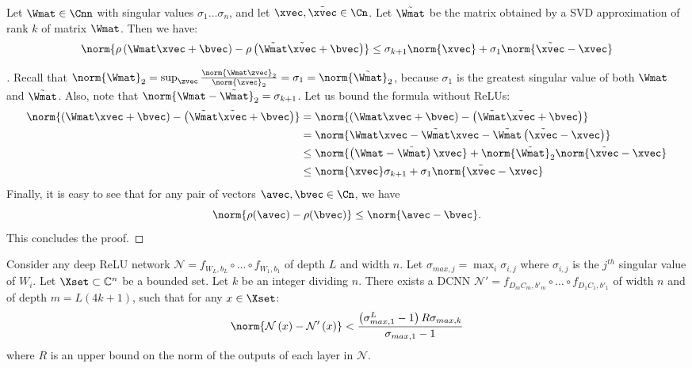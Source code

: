 \begin{lemma}
  Let $\Wmat \in \Cnn$ with singular values $\sigma_{1} \ldots \sigma_{n}$, and let $\xvec,\tilde{\xvec} \in \Cn$.
  Let $\tilde{\Wmat}$ be the matrix obtained by a SVD approximation of rank $k$ of matrix $\Wmat$.
  Then we have:
  \begin{equation}
    \norm{ \rho \left( \Wmat\xvec + \bvec \right) - \rho \left( \tilde{\Wmat}\tilde{\xvec}+\bvec\right)} \le \sigma_{k+1} \norm{\xvec} + \sigma_{1} \norm{\tilde{\xvec} - \xvec} 
  \end{equation}
  \label{lemma:bound_one_layer}
\end{lemma}

\begin{proof}[]
  Recall that $\norm{\Wmat}_{2} = \sup_{\zvec} \frac{\norm{\Wmat\zvec}_2}{\norm{\zvec}_2 } = \sigma_{1} = \norm{\tilde{\Wmat}}_{2}$, because $\sigma_{1}$ is the greatest singular value of both $\Wmat$ and $\tilde{\Wmat}$. Also, note that $\norm{\Wmat - \tilde{\Wmat}}_{2} = \sigma_{k+1}$. Let us bound the formula without ReLUs:
  \begin{align}
    \norm{\left(\Wmat\xvec+\bvec\right) - \left(\tilde{\Wmat}\tilde{\xvec}+\bvec\right)} &= \norm{\left(\Wmat\xvec+\bvec\right) - \left(\tilde{\Wmat}\tilde{\xvec}+\bvec\right)} \\
     &= \norm{\Wmat\xvec - \tilde{\Wmat}\xvec - \tilde{\Wmat}\left(\tilde{\xvec}-\xvec\right)} \\
     &\le \norm{\left(\Wmat - \tilde{\Wmat}\right)\xvec} + \norm{\tilde{\Wmat}}_{2} \norm{\tilde{\xvec} - \xvec} \\
     &\le \norm{\xvec} \sigma_{k+1} + \sigma_{1} \norm{\tilde{\xvec} - \xvec} 
  \end{align}
  Finally, it is easy to see that for any pair of vectors $\avec,\bvec \in \Cn$, we have
  \begin{equation}
    \norm{ \rho(\avec) - \rho(\bvec)} \le \norm{\avec - \bvec}.
  \end{equation}
  This concludes the proof.
\end{proof}

\begin{corollary}
  Consider any deep ReLU network $\mathcal{N} = f_{W_{L},b_{L}} \circ \ldots \circ f_{W_{1},b_{1}}$ of depth $L$ and width $n$.
  Let $\sigma_{max,j} = \max_{i} \sigma_{i,j}$ where $\sigma_{i,j}$ is the $j^{th}$ singular value of $W_{i}$.
  Let $\Xset \subset \mathbb{C}^{n}$ be a bounded set.
  Let $k$ be an integer dividing $n$.
  There exists a DCNN $\mathcal{N}' = f_{D_{m}C_{m},b'_{m}} \circ \ldots \circ f_{D_{1}C_{1},b'_{1}}$ of width $n$ and of depth $m=L(4k+1)$, such that for any $x\in\Xset$:
  \begin{equation}
    \norm{ \mathcal{N}\left(x\right) - \mathcal{N}'\left(x\right)} < \frac{\left(\sigma_{max,1}^{L}-1\right)R\sigma_{max,k}}{\sigma_{max,1}-1}
  \end{equation}
  where $R$ is an upper bound on the norm of the outputs of each layer in $\mathcal{N}$.
  \label{corollary:relu_to_circ}
\end{corollary}

